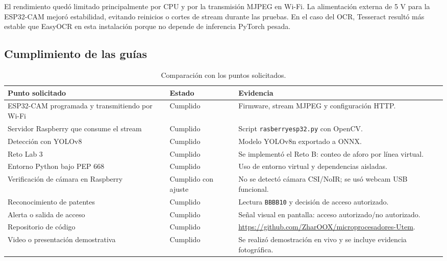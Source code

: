 \documentclass[12pt, letterpaper]{article}
\begin{document}
El rendimiento quedó limitado principalmente por CPU y por la transmisión MJPEG en Wi-Fi. La alimentación externa de 5 V para la ESP32-CAM mejoró estabilidad, evitando reinicios o cortes de stream durante las pruebas. En el caso del OCR, Tesseract resultó más estable que EasyOCR en esta instalación porque no depende de inferencia PyTorch pesada.

\subsection{Cumplimiento de las guías}

\begin{table}[H]
    \centering
    \caption{Comparación con los puntos solicitados.}
    \begin{tabular}{p{} p{} p{}}
    \toprule
    \textbf{Punto solicitado} & \textbf{Estado} & \textbf{Evidencia} \\
    \midrule
    ESP32-CAM programada y transmitiendo por Wi-Fi & Cumplido & Firmware, stream MJPEG y configuración HTTP. \\
    Servidor Raspberry que consume el stream & Cumplido & Script \texttt{rasberryesp32.py} con OpenCV. \\
    Detección con YOLOv8 & Cumplido & Modelo YOLOv8n exportado a ONNX. \\
    Reto Lab 3 & Cumplido & Se implementó el Reto B: conteo de aforo por línea virtual. \\
    Entorno Python bajo PEP 668 & Cumplido & Uso de entorno virtual y dependencias aisladas. \\
    Verificación de cámara en Raspberry & Cumplido con ajuste & No se detectó cámara CSI/NoIR; se usó webcam USB funcional. \\
    Reconocimiento de patentes & Cumplido & Lectura \texttt{BBBB10} y decisión de acceso autorizado. \\
    Alerta o salida de acceso & Cumplido & Señal visual en pantalla: acceso autorizado/no autorizado. \\
    Repositorio de código & Cumplido & \url{https://github.com/ZharOOX/microprocesadores-Utem}. \\
    Video o presentación demostrativa & Cumplido & Se realizó demostración en vivo y se incluye evidencia fotográfica. \\
    \bottomrule
    \end{tabular}
\end{table}
\end{document}
